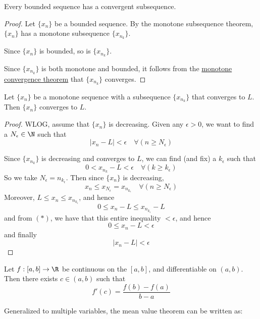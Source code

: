 \label{d277ad0}

Every bounded sequence has a convergent subsequence.

\begin{proof}
	\def\xn{\{x_n\}}
	\def\xnk{\{x_{n_k}\}}

	Let $\xn$ be a bounded sequence. By the monotone subsequence
	theorem, $\xn$ has a monotone subsequence $\xnk$.

	Since $\xn$ is bounded, so is $\xnk$.

	Since $\xnk$ is both monotone and bounded, it follows from the
	\hyperref[ca25eb7]{monotone convergence theorem} that $\xnk$
	converges.
\end{proof}


\label{aaf3ba6}

Let $\{x_n\}$ be a monotone sequence with a subsequence $\{x_{n_k}\}$
that converges to $L$. Then $\{x_n\}$ converges to $L$.

\begin{proof}
	WLOG, assume that $\{x_n\}$ is decreasing.
	Given any $\epsilon>0$, we want to find a $N_\epsilon\in\N$ such that
	$$
		|x_n-L|<\epsilon\quad\forall(n\geq N_\epsilon)
	$$

	Since $\{x_{n_k}\}$ is decreasing and converges to $L$, we can find
	(and fix) a $k_\epsilon$ such that
	\begin{equation*}
		0<x_{n_k}-L<\epsilon\quad\forall(k\geq k_\epsilon)\tag*{($*$)}
	\end{equation*}
	So we take $N_\epsilon=n_{k_\epsilon}$. Then since $\{x_n\}$ is
	decreasing,
	$$
		x_n\leq x_{N_\epsilon}=x_{n_{k_\epsilon}}\quad\forall(n\geq N_\epsilon)
	$$
	Moreover, $L\leq x_n\leq x_{n_{k_\epsilon}}$, and hence
	$$0\leq x_n-L\leq x_{n_{k_\epsilon}}-L$$
	and from $(*)$, we have that this entire inequality $<\epsilon$, and hence
	$$0\leq x_n-L<\epsilon$$
	and finally
	$$|x_n-L|<\epsilon$$
\end{proof}

\label{d37aa2b}

Let $f:[a,b]\to\R$ be continuous on the $[a,b]$, and differentiable on
$(a,b)$. Then there exists $c\in(a,b)$ such that
$$
	f'(c)=\frac{f(b)-f(a)}{b-a}
$$

Generalized to multiple variables, the mean value theorem can be
written as:

